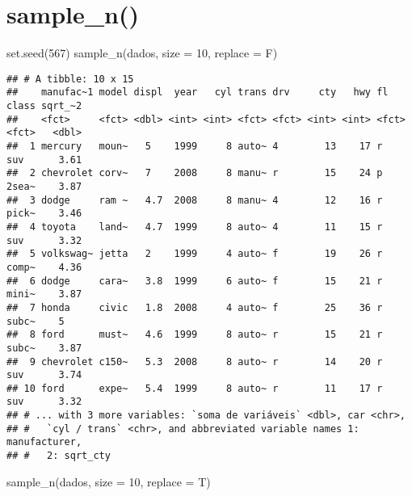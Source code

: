 \documentclass[
]{book}
\newenvironment{Shaded}{\begin{snugshade}}{\end{snugshade}}
\newcommand{\AttributeTok}[1]{\textcolor[rgb]{0.77,0.63,0.00}{#1}}
\newcommand{\DecValTok}[1]{\textcolor[rgb]{0.00,0.00,0.81}{#1}}
\newcommand{\FunctionTok}[1]{\textcolor[rgb]{0.00,0.00,0.00}{#1}}
\newcommand{\NormalTok}[1]{#1}
\begin{document}
\hypertarget{sample_n}{%
\section{sample\_n()}\label{sample_n}}

\begin{Shaded}
\begin{Highlighting}[]
\FunctionTok{set.seed}\NormalTok{(}\DecValTok{567}\NormalTok{)}
\FunctionTok{sample\_n}\NormalTok{(dados, }\AttributeTok{size =} \DecValTok{10}\NormalTok{, }\AttributeTok{replace =}\NormalTok{ F)}
\end{Highlighting}
\end{Shaded}

\begin{verbatim}
## # A tibble: 10 x 15
##    manufac~1 model displ  year   cyl trans drv     cty   hwy fl    class sqrt_~2
##    <fct>     <fct> <dbl> <int> <int> <fct> <fct> <int> <int> <fct> <fct>   <dbl>
##  1 mercury   moun~   5    1999     8 auto~ 4        13    17 r     suv      3.61
##  2 chevrolet corv~   7    2008     8 manu~ r        15    24 p     2sea~    3.87
##  3 dodge     ram ~   4.7  2008     8 manu~ 4        12    16 r     pick~    3.46
##  4 toyota    land~   4.7  1999     8 auto~ 4        11    15 r     suv      3.32
##  5 volkswag~ jetta   2    1999     4 auto~ f        19    26 r     comp~    4.36
##  6 dodge     cara~   3.8  1999     6 auto~ f        15    21 r     mini~    3.87
##  7 honda     civic   1.8  2008     4 auto~ f        25    36 r     subc~    5   
##  8 ford      must~   4.6  1999     8 auto~ r        15    21 r     subc~    3.87
##  9 chevrolet c150~   5.3  2008     8 auto~ r        14    20 r     suv      3.74
## 10 ford      expe~   5.4  1999     8 auto~ r        11    17 r     suv      3.32
## # ... with 3 more variables: `soma de variáveis` <dbl>, car <chr>,
## #   `cyl / trans` <chr>, and abbreviated variable names 1: manufacturer,
## #   2: sqrt_cty
\end{verbatim}

\begin{Shaded}
\begin{Highlighting}[]
\FunctionTok{sample\_n}\NormalTok{(dados, }\AttributeTok{size =} \DecValTok{10}\NormalTok{, }\AttributeTok{replace =}\NormalTok{ T)}
\end{Highlighting}
\end{Shaded}
\end{document}
